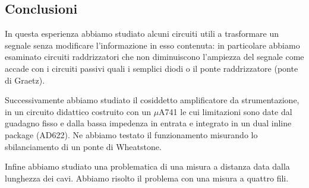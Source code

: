 \subsection*{Conclusioni}
In questa esperienza abbiamo studiato alcuni circuiti utili a trasformare un segnale senza modificare l'informazione in esso contenuta: in particolare abbiamo esaminato circuiti raddrizzatori che non diminuiscono l'ampiezza del segnale come accade con i circuiti passivi quali i semplici diodi o il ponte raddrizzatore (ponte di Graetz).

Successivamente abbiamo studiato il cosiddetto amplificatore da strumentazione, in un circuito didattico costruito con un $\mu$A741 le cui limitazioni sono date dal guadagno fisso e dalla bassa impedenza in entrata e integrato in un dual inline package (AD622).
Ne abbiamo testato il funzionamento misurando lo sbilanciamento di un ponte di Wheatstone.

Infine abbiamo studiato una problematica di una misura a distanza data dalla lunghezza dei cavi.
Abbiamo risolto il problema con una misura a quattro fili.